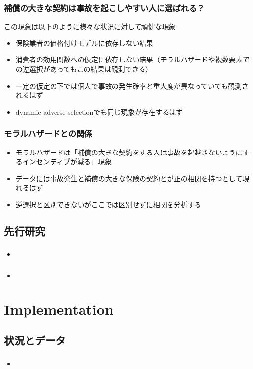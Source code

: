 \documentclass[dvipdfmx, 12pt]{beamer}
\begin{document}
\begin{frame}\frametitle{\small 補償の大きな契約は事故を起こしやすい人に選ばれる？}
この現象は以下のように様々な状況に対して頑健な現象
	\begin{itemize}
	\item 保険業者の価格付けモデルに依存しない結果
	\item 消費者の効用関数への仮定に依存しない結果（モラルハザードや複数要素での逆選択があってもこの結果は観測できる）
	\item 一定の仮定の下では個人で事故の発生確率と重大度が異なっていても観測されるはず
	\item dynamic adverse selectionでも同じ現象が存在するはず
	\end{itemize}
\end{frame}

\begin{frame}\frametitle{モラルハザードとの関係}
	\begin{itemize}
	\item モラルハザードは「補償の大きな契約をする人は事故を起越さないようにするインセンティブが減る」現象
	\item データには事故発生と補償の大きな保険の契約とが正の相関を持つとして現れるはず
	\item 逆選択と区別できないがここでは区別せずに相関を分析する
	\end{itemize}
\end{frame}

\subsection{先行研究}
\begin{frame}\frametitle{}
	\begin{itemize}
	\item 
	\end{itemize}
\end{frame}

\begin{frame}\frametitle{}
	\begin{itemize}
	\item 
	\end{itemize}
\end{frame}


\section{Implementation}
\subsection{状況とデータ}
\begin{frame}\frametitle{}
	\begin{itemize}
	\item 
	\end{itemize}
\end{frame}
\end{document}
